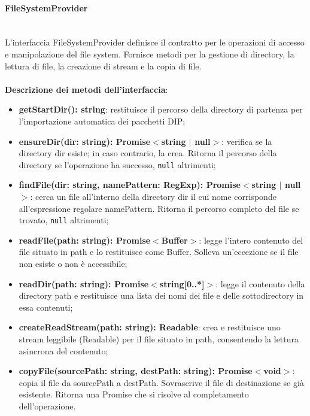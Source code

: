\documentclass[a4paper,12pt]{article}
\begin{document}
{{{                \paragraph{FileSystemProvider}\label{par:FileSystemProvider}\mbox{}\\
                L'interfaccia FileSystemProvider definisce il contratto per le operazioni di accesso e manipolazione del file system. Fornisce metodi per la gestione di directory, la lettura di file, la creazione di stream e la copia di file.\\
                \\
                \noindent \textbf{Descrizione dei metodi dell'interfaccia}:
                \begin{itemize}
                    \item \textbf{getStartDir(): string}: restituisce il percorso della directory di partenza per l'importazione automatica dei pacchetti DIP;
                    \item \textbf{ensureDir(dir: string): Promise$<$string $|$ null$>$}: verifica se la directory dir esiste; in caso contrario, la crea. Ritorna il percorso della directory se l'operazione ha successo, \texttt{null} altrimenti;
                    \item \textbf{findFile(dir: string, namePattern: RegExp): Promise$<$string $|$ null$>$}: cerca un file all'interno della directory dir il cui nome corrisponde all'espressione regolare namePattern. Ritorna il percorso completo del file se trovato, \texttt{null} altrimenti;
                    \item \textbf{readFile(path: string): Promise$<$Buffer$>$}: legge l'intero contenuto del file situato in path e lo restituisce come Buffer. Solleva un'eccezione se il file non esiste o non è accessibile;
                    \item \textbf{readDir(path: string): Promise$<$string[0..*]$>$}: legge il contenuto della directory path e restituisce una lista dei nomi dei file e delle sottodirectory in essa contenuti;
                    \item \textbf{createReadStream(path: string): Readable}: crea e restituisce uno stream leggibile (Readable) per il file situato in path, consentendo la lettura asincrona del contenuto;
                    \item \textbf{copyFile(sourcePath: string, destPath: string): Promise$<$void$>$}: copia il file da sourcePath a destPath. Sovrascrive il file di destinazione se già esistente. Ritorna una Promise che si risolve al completamento dell'operazione.
                \end{itemize}
}}}
\end{document}

